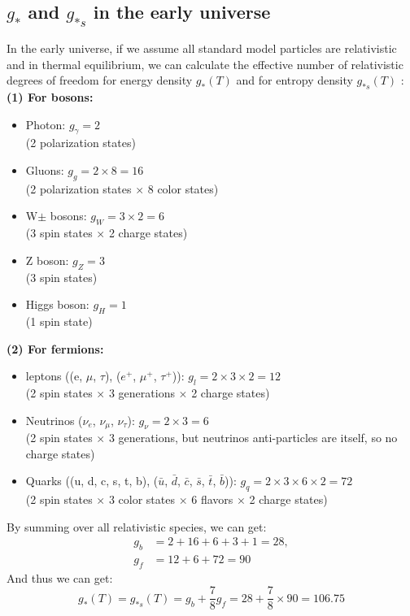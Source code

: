 \subsection{\texorpdfstring{$g_*$ and $g_{*s}$}{g* and g*s} in the early universe}
\begin{foundation}
    In the early universe, if we assume all standard model particles are relativistic and in thermal equilibrium, we can calculate the effective number of relativistic degrees of freedom for energy density $g_*(T)$ and for entropy density $g_{*s}(T)$ : \\
    
    \textbf{(1) For bosons:}
    \begin{itemize}
        \item Photon: $g_\gamma = 2$ \\(2 polarization states)
        \item Gluons: $g_g = 2 \times 8 = 16$ \\(2 polarization states $\times$ 8 color states)
        \item W$\pm$ bosons: $g_W = 3 \times 2 = 6$ \\(3 spin states $\times$ 2 charge states)
        \item Z boson: $g_Z = 3$ \\(3 spin states)
        \item Higgs boson: $g_H = 1$ \\(1 spin state)
    \end{itemize}

    \textbf{(2) For fermions:}
    \begin{itemize}
        \item leptons ((e, $\mu$, $\tau$), ($e^+$, $\mu^+$, $\tau^+$)): $g_l = 2 \times 3 \times 2 = 12$ \\(2 spin states $\times$ 3 generations $\times$ 2 charge states)
        \item Neutrinos ($\nu_e$, $\nu_\mu$, $\nu_\tau$): $g_{\nu} = 2 \times 3 = 6$ \\(2 spin states $\times$ 3 generations, but neutrinos anti-particles are itself, so no charge states)
        \item Quarks ((u, d, c, s, t, b), ($\bar{u}$, $\bar{d}$, $\bar{c}$, $\bar{s}$, $\bar{t}$, $\bar{b}$)): $g_q = 2 \times 3 
        \times 6 \times 2 = 72$ \\(2 spin states $\times$ 3 color states $\times$ 6 flavors $\times$ 2 charge states)
    \end{itemize}

    By summing over all relativistic species, we can get:
    \begin{align*}
        g_b &= 2 + 16 + 6 + 3 + 1 = 28, \\
        g_f &= 12 + 6 + 72 = 90
    \end{align*}
    And thus we can get:
    \[
        g_*(T) = g_{*s}(T) = g_b + \frac{7}{8} g_f = 28 + \frac{7}{8} \times 90 = 106.75
    \]
\end{foundation}

